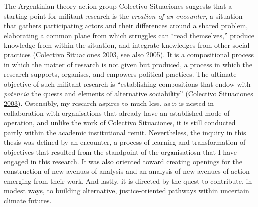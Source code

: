 \documentclass[a4paper, nobind]{templates/ociamthesis}
\begin{document}
The Argentinian theory action group Colectivo Situaciones suggests that a starting point for militant research is the \emph{creation of an encounter}, a situation that gathers participating actors and their differences around a shared problem, elaborating a common plane from which struggles can ``read themselves,'' produce knowledge from within the situation, and integrate knowledges from other social practices (\protect\hyperlink{ref-colectivo_situaciones_researcher-militant_2003}{Colectivo Situaciones 2003}, see also \protect\hyperlink{ref-colectivo_situaciones_something_2005}{2005}). It is a compositional process in which the matter of research is not given but produced, a process in which the research supports, organises, and empowers political practices. The ultimate objective of such militant research is ``establishing compositions that endow with \emph{potencia} the quests and elements of alternative sociability'' (\protect\hyperlink{ref-colectivo_situaciones_researcher-militant_2003}{Colectivo Situaciones 2003}). Ostensibly, my research aspires to much less, as it is nested in collaboration with organisations that already have an established mode of operation, and unlike the work of Colectivo Situaciones, it is still conducted partly within the academic institutional remit. Nevertheless, the inquiry in this thesis was defined by an encounter, a process of learning and transformation of objectives that resulted from the standpoint of the organisatiosn that I have engaged in this research. It was also oriented toward creating openings for the construction of new avenues of analysis and an analysis of new avenues of action emerging from their work. And lastly, it is directed by the quest to contribute, in modest ways, to building alternative, justice-oriented pathways within uncertain climate futures.
\end{document}
